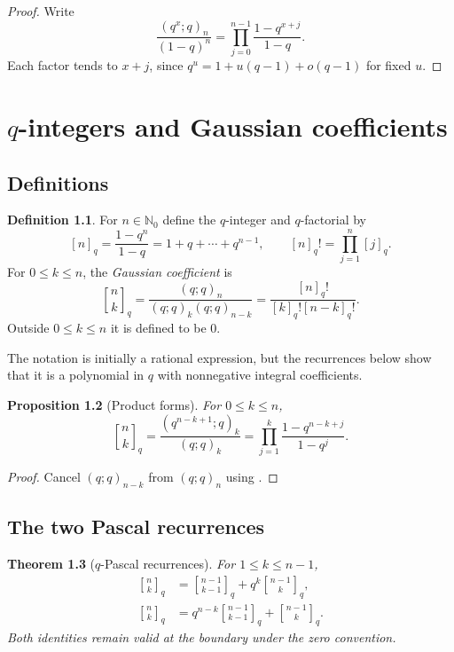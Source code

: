 \documentclass[11pt,oneside,openany]{book}
\newtheorem{theorem}{Theorem}[chapter]
\newtheorem{proposition}[theorem]{Proposition}
\theoremstyle{definition}
\newtheorem{definition}[theorem]{Definition}
\theoremstyle{remark}
\newcommand{\qbinom}[2]{\genfrac{[}{]}{0pt}{}{#1}{#2}_{q}}
\newcommand{\N}{\mathbb N}
\begin{document}
\begin{proof}
Write
\[
 \frac{(q^x;q)_n}{(1-q)^n}
 =\prod_{j=0}^{n-1}\frac{1-q^{x+j}}{1-q}.
\]
Each factor tends to $x+j$, since $q^u=1+u(q-1)+o(q-1)$ for fixed $u$.
\end{proof}

\chapter{\texorpdfstring{$q$}{q}-integers and Gaussian coefficients}\label{chap:gaussian}

\section{Definitions}

\begin{definition}
For $n\in\N_0$ define the $q$-integer and $q$-factorial by
\[
 [n]_q=\frac{1-q^n}{1-q}=1+q+\cdots+q^{n-1},
 \qquad
 [n]_q!=\prod_{j=1}^{n}[j]_q.
\]
For $0\le k\le n$, the \emph{Gaussian coefficient} is
\[
 \qbinom nk
 =\frac{(q;q)_n}{(q;q)_k(q;q)_{n-k}}
 =\frac{[n]_q!}{[k]_q![n-k]_q!}.
\]
Outside $0\le k\le n$ it is defined to be $0$.
\end{definition}

The notation is initially a rational expression, but the recurrences below show that it is a polynomial in $q$ with nonnegative integral coefficients.

\begin{proposition}[Product forms]\label{prop:qbinom-products}
For $0\le k\le n$,
\[
 \qbinom nk
 =\frac{(q^{n-k+1};q)_k}{(q;q)_k}
 =\prod_{j=1}^{k}\frac{1-q^{n-k+j}}{1-q^j}.
\]
\end{proposition}

\begin{proof}
Cancel $(q;q)_{n-k}$ from $(q;q)_n$ using .
\end{proof}

\section{The two Pascal recurrences}

\begin{theorem}[$q$-Pascal recurrences]\label{thm:qpascal}
For $1\le k\le n-1$,
\begin{align}
 \qbinom nk&=\qbinom{n-1}{k-1}+q^k\qbinom{n-1}{k},\label{eq:qpascal1}\\
 \qbinom nk&=q^{n-k}\qbinom{n-1}{k-1}+\qbinom{n-1}{k}.\label{eq:qpascal2}
\end{align}
Both identities remain valid at the boundary under the zero convention.
\end{theorem}
\end{document}
